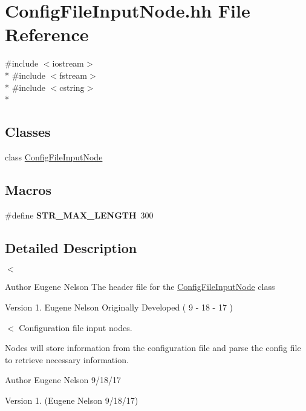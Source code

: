 \hypertarget{_config_file_input_node_8hh}{\section{Config\-File\-Input\-Node.\-hh File Reference}
\label{_config_file_input_node_8hh}
}
{\ttfamily \#include $<$iostream$>$}\\*
{\ttfamily \#include $<$fstream$>$}\\*
{\ttfamily \#include $<$cstring$>$}\\*
\subsection*{Classes}
\begin{DoxyCompactItemize}
\item 
class \hyperlink{class_config_file_input_node}{Config\-File\-Input\-Node}
\end{DoxyCompactItemize}
\subsection*{Macros}
\begin{DoxyCompactItemize}
\item 
\hypertarget{_config_file_input_node_8hh_ada55f6bc0463a1a51589c6f6755fd29a}{\#define {\bfseries S\-T\-R\-\_\-\-M\-A\-X\-\_\-\-L\-E\-N\-G\-T\-H}~300}\label{_config_file_input_node_8hh_ada55f6bc0463a1a51589c6f6755fd29a}

\end{DoxyCompactItemize}


\subsection{Detailed Description}
$<$

\begin{DoxyAuthor}{Author}
Eugene Nelson  The header file for the \hyperlink{class_config_file_input_node}{Config\-File\-Input\-Node} class 
\end{DoxyAuthor}
\begin{DoxyVersion}{Version}
1. Eugene Nelson Originally Developed ( 9 -\/ 18 -\/ 17 )
\end{DoxyVersion}
$<$ Configuration file input nodes.

Nodes will store information from the configuration file and parse the config file to retrieve necessary information.

\begin{DoxyAuthor}{Author}
Eugene Nelson  9/18/17 
\end{DoxyAuthor}
\begin{DoxyVersion}{Version}
1. (Eugene Nelson 9/18/17) 
\end{DoxyVersion}
